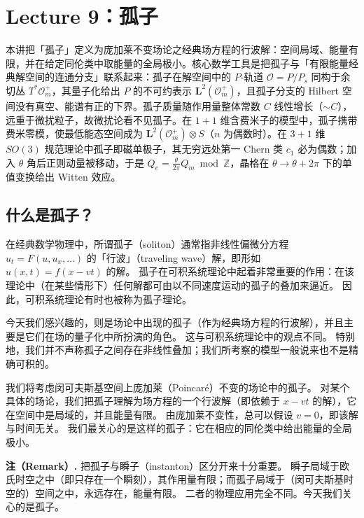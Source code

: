 \section{Lecture 9：孤子}

\begin{keytakeaways}
本讲把「孤子」定义为庞加莱不变场论之经典场方程的行波解：空间局域、能量有限，并在给定同伦类中取能量的全局极小。核心数学工具是把孤子与「有限能量经典解空间的连通分支」联系起来：孤子在解空间中的 $P$-轨道 $\mathcal{O}=P/P_s$ 同构于余切丛 $T^*\mathcal{O}^+_m$，其量子化给出 $P$ 的不可约表示 $\mathbf{L}^2(\mathcal{O}^+_m)$，且孤子分支的 Hilbert 空间没有真空、能谱有正的下界。孤子质量随作用量整体常数 $C$ 线性增长（$\sim C$），远重于微扰粒子，故微扰论看不见孤子。在 $1+1$ 维含费米子的模型中，孤子携带费米零模，使最低能态空间成为 $\mathbf{L}^2(\mathcal{O}^+_m)\otimes S$（$n$ 为偶数时）。在 $3+1$ 维 $SO(3)$ 规范理论中孤子即磁单极子，其无穷远处第一 Chern 类 $c_1$ 必为偶数；加入 $\theta$ 角后正则动量被移动，于是 $Q_e=\frac{\theta}{2\pi}Q_m\bmod\mathbb{Z}$，晶格在 $\theta\to\theta+2\pi$ 下的单值变换给出 Witten 效应。
\end{keytakeaways}

\subsection{什么是孤子？}

在经典数学物理中，所谓孤子（soliton）通常指非线性偏微分方程 $u_t=F(u,u_x,\dots)$ 的「行波」（traveling wave）解，即形如 $u(x,t)=f(x-vt)$ 的解。
孤子在可积系统理论中起着非常重要的作用：在该理论中（在某些情形下）任何解都可由以不同速度运动的孤子的叠加来逼近。
因此，可积系统理论有时也被称为孤子理论。

今天我们感兴趣的，则是场论中出现的孤子（作为经典场方程的行波解），并且主要是它们在场的量子化中所扮演的角色。
这与可积系统理论中的观点不同。
特别地，我们并不声称孤子之间存在非线性叠加；我们所考察的模型一般说来也不是精确可积的。

我们将考虑闵可夫斯基空间上庞加莱（Poincaré）不变的场论中的孤子。
对某个具体的场论，我们把孤子理解为场方程的一个行波解（即依赖于 $x-vt$ 的解），它在空间中是局域的，并且能量有限。
由庞加莱不变性，总可以假设 $v=0$，即该解与时间无关。
我们最关心的是这样的孤子：它在相应的同伦类中给出能量的全局极小。

\textbf{注（Remark）.}
把孤子与瞬子（instanton）区分开来十分重要。
瞬子局域于欧氏时空之中（即只存在一个瞬刻），其作用量有限；而孤子局域于（闵可夫斯基时空的）空间之中，永远存在，能量有限。
二者的物理应用完全不同。今天我们关心的是孤子。

